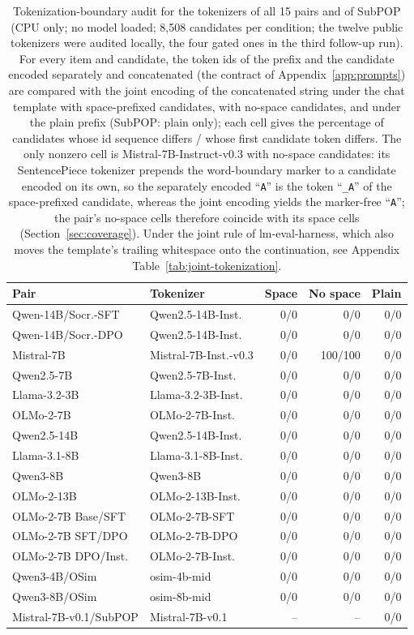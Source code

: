 \begin{table}[t]
\centering\scriptsize
\setlength{\tabcolsep}{2.5pt}
\begin{tabular}{@{}llrrr@{}}
\toprule
Pair & Tokenizer & Space & No space & Plain \\
\midrule
Qwen-14B/Socr.-SFT & Qwen2.5-14B-Inst. & 0/0 & 0/0 & 0/0 \\
Qwen-14B/Socr.-DPO & Qwen2.5-14B-Inst. & 0/0 & 0/0 & 0/0 \\
Mistral-7B & Mistral-7B-Inst.-v0.3 & 0/0 & 100/100 & 0/0 \\
Qwen2.5-7B & Qwen2.5-7B-Inst. & 0/0 & 0/0 & 0/0 \\
Llama-3.2-3B & Llama-3.2-3B-Inst. & 0/0 & 0/0 & 0/0 \\
OLMo-2-7B & OLMo-2-7B-Inst. & 0/0 & 0/0 & 0/0 \\
Qwen2.5-14B & Qwen2.5-14B-Inst. & 0/0 & 0/0 & 0/0 \\
Llama-3.1-8B & Llama-3.1-8B-Inst. & 0/0 & 0/0 & 0/0 \\
Qwen3-8B & Qwen3-8B & 0/0 & 0/0 & 0/0 \\
OLMo-2-13B & OLMo-2-13B-Inst. & 0/0 & 0/0 & 0/0 \\
OLMo-2-7B Base/SFT & OLMo-2-7B-SFT & 0/0 & 0/0 & 0/0 \\
OLMo-2-7B SFT/DPO & OLMo-2-7B-DPO & 0/0 & 0/0 & 0/0 \\
OLMo-2-7B DPO/Inst. & OLMo-2-7B-Inst. & 0/0 & 0/0 & 0/0 \\
Qwen3-4B/OSim & osim-4b-mid & 0/0 & 0/0 & 0/0 \\
Qwen3-8B/OSim & osim-8b-mid & 0/0 & 0/0 & 0/0 \\
Mistral-7B-v0.1/SubPOP & Mistral-7B-v0.1 & -- & -- & 0/0 \\
\bottomrule
\end{tabular}
\caption{Tokenization-boundary audit for the tokenizers of all 15 pairs and of SubPOP (CPU only; no model loaded; 8,508 candidates per condition; the twelve public tokenizers were audited locally, the four gated ones in the third follow-up run). For every item and candidate, the token ids of the prefix and the candidate encoded separately and concatenated (the contract of Appendix~\ref{app:prompts}) are compared with the joint encoding of the concatenated string under the chat template with space-prefixed candidates, with no-space candidates, and under the plain prefix (SubPOP: plain only); each cell gives the percentage of candidates whose id sequence differs / whose first candidate token differs. The only nonzero cell is Mistral-7B-Instruct-v0.3 with no-space candidates: its SentencePiece tokenizer prepends the word-boundary marker to a candidate encoded on its own, so the separately encoded ``\texttt{A}'' is the token ``\texttt{\_A}'' of the space-prefixed candidate, whereas the joint encoding yields the marker-free ``\texttt{A}''; the pair's no-space cells therefore coincide with its space cells (Section~\ref{sec:coverage}). Under the joint rule of lm-eval-harness, which also moves the template's trailing whitespace onto the continuation, see Appendix Table~\ref{tab:joint-tokenization}.}
\label{tab:tokenization-boundary}
\end{table}
